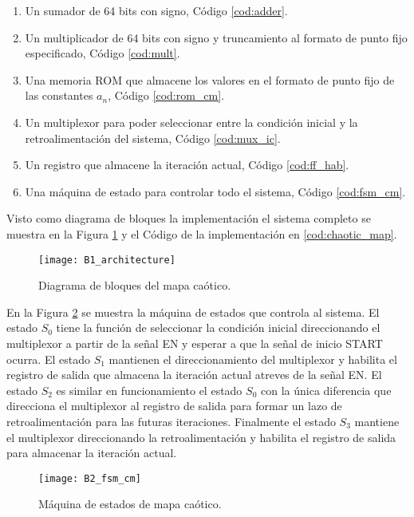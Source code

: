         \begin{enumerate}
            \item Un sumador de 64 bits con signo, Código \ref{cod:adder}.
            \item Un multiplicador de 64 bits con signo y truncamiento al formato de punto fijo especificado, Código \ref{cod:mult}.
            \item Una memoria ROM que almacene los valores en el formato de punto fijo de las constantes $a_{n}$, Código \ref{cod:rom_cm}.
            \item Un multiplexor para poder seleccionar entre la condición inicial y la retroalimentación del sistema, Código \ref{cod:mux_ic}.
            \item Un registro que almacene la iteración actual, Código \ref{cod:ff_hab}.
            \item Una máquina de estado para controlar todo el sistema, Código \ref{cod:fsm_cm}.            
        \end{enumerate}
    
        Visto como diagrama de bloques la implementación el sistema completo se muestra en la Figura \ref{fig:B1_architecture} y el Código de la implementación en \ref{cod:chaotic_map}.
        
        \begin{figure}[hbtp]
            \caption{Diagrama de bloques del mapa caótico.}
            \centering
            \texttt{[image: B1\_architecture]}
            \label{fig:B1_architecture}
        \end{figure}

        En la Figura \ref{fig:B2_fsm_cm} se muestra la máquina de estados que controla al sistema. El estado $S_{0}$ tiene la función de seleccionar la condición inicial direccionando el multiplexor a partir de la señal EN y esperar a que la señal de inicio START ocurra. El estado $S_{1}$ mantienen el direccionamiento del multiplexor y habilita el registro de salida que almacena la iteración actual atreves de la señal EN. El estado $S_{2}$ es similar en funcionamiento el estado $S_{0}$ con la única diferencia que direcciona el multiplexor al registro de salida para formar un lazo de retroalimentación para las futuras iteraciones. Finalmente el estado $S_{3}$ mantiene el multiplexor direccionando la retroalimentación y habilita el registro de salida para almacenar la iteración actual. 

        \begin{figure}[hbtp]
            \caption{Máquina de estados de mapa caótico.}
            \centering
            \texttt{[image: B2\_fsm\_cm]}
            \label{fig:B2_fsm_cm}
        \end{figure}


